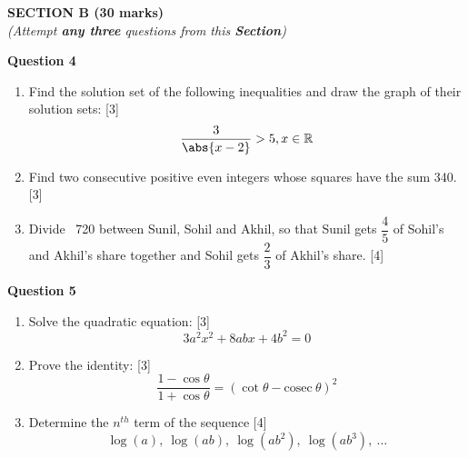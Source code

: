\newpage
\begin{center}
   \large
   \textbf{SECTION B (30 marks)}\\
   \vspace{5mm}
   \normalsize
   \textit{(Attempt \textbf{any three} questions from this \textbf{Section})}
\end{center}
\par

\noindent
\textbf{Question 4}
\begin{enumerate}[label=(\roman*)]

    \item Find the solution set of the following inequalities and draw the 
        graph of their solution sets: \hfill[3]
        \[
            \frac{3}{\abs{x-2}} > 5, x \in \mathbb{R}
        \]

    \item Find two consecutive positive even integers whose squares have 
        the sum 340. \hfill [3]

    \item Divide \rupee~720 between Sunil, Sohil and Akhil, so that 
        Sunil gets $\dfrac45$ of Sohil's and Akhil's share together 
        and Sohil gets $\dfrac23$ of Akhil's share. \hfill [4]

\end{enumerate}

\noindent
\textbf{Question 5}
\begin{enumerate}[label=(\roman*)]

    \item Solve the quadratic equation: \hfill [3]
        \[
            3a^2x^2 + 8abx + 4b^2 = 0
        \]

    \item Prove the identity: \hfill [3]
        \[
            \frac{1 - \cos \theta}{1 + \cos \theta} = 
            (\cot \theta - \mathrm{cosec} \ \theta)^2
        \]

    \item Determine the $n^{th}$ term of the sequence \hfill [4]
        \[
            \log(a),\ \log(ab),\ \log(ab^2),\ \log(ab^3),\ \dots
        \]

\end{enumerate}

